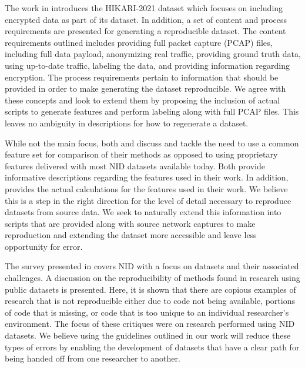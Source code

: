 \documentclass[sigconf]{acmart}
\begin{document}
The work in \cite{ferriyan2021} introduces the HIKARI-2021 dataset which focuses on including encrypted data as part of its dataset.
In addition, a set of content and process requirements are presented for generating a reproducible dataset.
The content requirements outlined includes providing full packet capture (PCAP) files, including full data payload, anonymizing real traffic,  providing ground truth data, using up-to-date traffic, labeling the data, and providing information regarding encryption.
The process requirements pertain to information that should be provided in order to make generating the dataset reproducible.
We agree with these concepts and look to extend them by proposing the inclusion of actual scripts to generate features and perform labeling along with full PCAP files.
This leaves no ambiguity in descriptions for how to regenerate a dataset.

While not the main focus, both \cite{e23111532} and \cite{layeghy2021} discuss and tackle the need to use a common feature set for comparison of their methods as opposed to using proprietary features delivered with most NID datasets available today.
Both provide informative descriptions regarding the features used in their work.
In addition, \cite{layeghy2021} provides the actual calculations for the features used in their work.
We believe this is a step in the right direction for the level of detail necessary to reproduce datasets from source data. 
We seek to naturally extend this information into scripts that are provided along with source network captures to make reproduction and extending the dataset more accessible and leave less opportunity for error.

The survey presented in \cite{Chou2022} covers NID with a focus on datasets and their associated challenges.
A discussion on the reproducibility of methods found in research using public datasets is presented.
Here, it is shown that there are copious examples of research that is not reproducible either due to code not being available, portions of code that is missing, or code that is too unique to an individual researcher's environment.
The focus of these critiques were on research performed using NID datasets.
We believe using the guidelines outlined in our work will reduce these types of errors by enabling the development of datasets that have a clear path for being handed off from one researcher to another.
\end{document}
